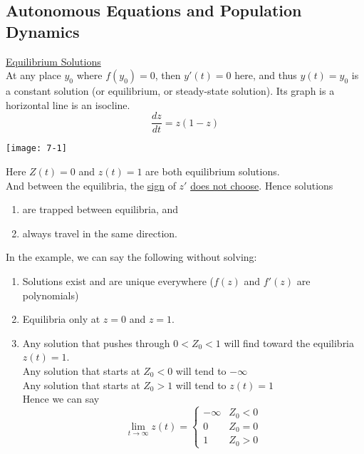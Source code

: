 \subsection*{Autonomous Equations and Population Dynamics}
{\large \underline{Equilibrium Solutions}}\\
At any place $y_0$ where $f(y_0) = 0$, then $y'(t) = 0$ here, and thus $y(t) = y_0$ is a constant solution (or equilibrium, or steady-state solution). Its graph is a horizontal line is an isocline.\\
\redhline
\begin{equation*}
	\dfrac{dz}{dt} = z(1-z)
\end{equation*}
\begin{center}
	\texttt{[image: 7-1]}
\end{center}
Here $Z(t) = 0$ and $z(t) = 1$ are both equilibrium solutions.\\
And between the equilibria, the \underline{sign} of $z'$ \underline{does not choose}. Hence solutions
\begin{enumerate}[label=\protect\circled{\Alph*}]
	\item are trapped between equilibria, and
	\item always travel in the same direction.
\end{enumerate}
In the example, we can say the following without solving:
\begin{enumerate}[label=\protect\circled{\Roman*}]
	\item Solutions exist and are unique everywhere ($f(z)$ and $f'(z)$ are polynomials)
	\item Equilibria only at $z=0$ and $z=1$.
	\item Any solution that pushes through $0 < Z_0 < 1$ will find toward the equilibria $z(t) = 1$.\\
		Any solution that starts at $Z_0 < 0$ will tend to $-\infty$\\
		Any solution that starts at $Z_0 > 1$ will tend to $z(t) = 1$\\ 
		Hence we can say
	\begin{equation*}
	\lim_{t \to \infty}z(t) = 
		\begin{cases}
			-\infty & Z_0 < 0\\
			0 & Z_0 = 0\\
			1 & Z_0 > 0
		\end{cases}
	\end{equation*}
\end{enumerate}
\redhline\\

